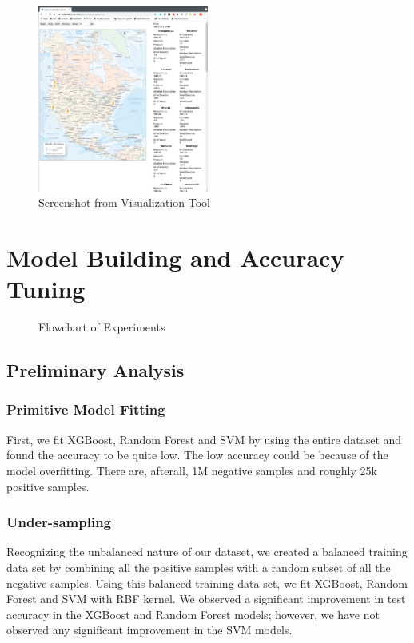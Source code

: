 \documentclass[10pt]{article}
\begin{document}
\begin{figure}[H]
    \centering
    \includegraphics[width=0.5\textwidth]{../res/screenshot.png}
    \caption{Screenshot from Visualization Tool}
\end{figure}
\section{Model Building and Accuracy Tuning}
\begin{figure}[H]
    \centering
    
    \caption{Flowchart of Experiments}
\end{figure}
\subsection{Preliminary Analysis}
\subsubsection{Primitive Model Fitting}
First, we fit XGBoost, Random Forest and SVM by using the entire dataset
and found the accuracy to be quite low. The low accuracy could be because
of the model overfitting. There are, afterall, 1M negative samples and
roughly 25k positive samples.\par
\subsubsection{Under-sampling}
Recognizing the unbalanced nature of our dataset, we created a balanced
training data set by combining all the positive samples with a random
subset of all the negative samples. Using this balanced training data set,
we fit XGBoost, Random Forest and SVM with RBF kernel. We observed a
significant improvement in test accuracy in the XGBoost and Random Forest
models; however, we have not observed any significant improvement in the
SVM models.\par
\end{document}
